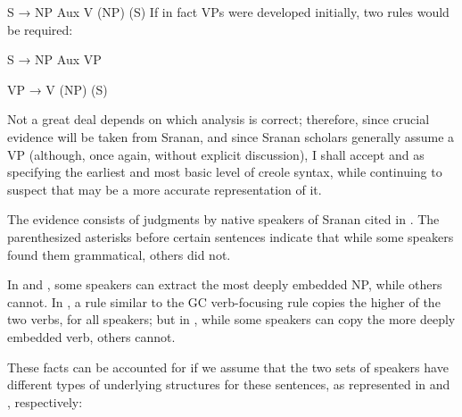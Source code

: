 \ea\label{ex:2:236}
 S → NP Aux V (NP) (S)
\z
If in fact VPs were developed initially, two rules would be required:

\ea\label{ex:2:237}
S → NP Aux VP
\z

\ea\label{ex:2:238}
 VP → V (NP) (S)
\z

Not a great deal depends on which analysis is correct; therefore, since crucial evidence will be taken from Sranan, and since Sranan scholars generally assume a VP (although, once again, without explicit discussion), I shall accept  and  as specifying the earliest and most basic level of creole syntax, while continuing to suspect that  may be a more accurate representation of it.

The evidence consists of judgments by native speakers of Sranan cited in \citet{JansenEtAl1978}. The parenthesized asterisks before certain sentences indicate that while some speakers found them grammatical, others did not.

\z

\z

\z

\z

\z

\z

\label{ex:2:245}\z
In  and , some speakers can extract the most deeply embed\-ded NP, while others cannot. In , a rule similar to the GC verb-focusing rule copies the higher of the two verbs, for all speakers; but in , while some speakers can copy the more deeply embedded verb, others cannot.

These facts can be accounted for if we assume that the two sets of speakers have different types of underlying structures for these sentences, as represented in  and , respectively:

